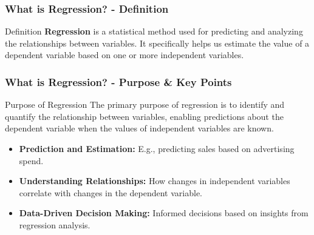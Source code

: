 \documentclass[aspectratio=169]{beamer}
\begin{document}
\begin{frame}[fragile]
    \frametitle{What is Regression? - Definition}
    \begin{block}{Definition}
        \textbf{Regression} is a statistical method used for predicting and analyzing the relationships between variables. It specifically helps us estimate the value of a dependent variable based on one or more independent variables.
    \end{block}
\end{frame}

\begin{frame}[fragile]
    \frametitle{What is Regression? - Purpose & Key Points}
    \begin{block}{Purpose of Regression}
        The primary purpose of regression is to identify and quantify the relationship between variables, enabling predictions about the dependent variable when the values of independent variables are known.
    \end{block}

    \begin{itemize}
        \item \textbf{Prediction and Estimation:} E.g., predicting sales based on advertising spend.
        \item \textbf{Understanding Relationships:} How changes in independent variables correlate with changes in the dependent variable.
        \item \textbf{Data-Driven Decision Making:} Informed decisions based on insights from regression analysis.
    \end{itemize}
\end{frame}
\end{document}
